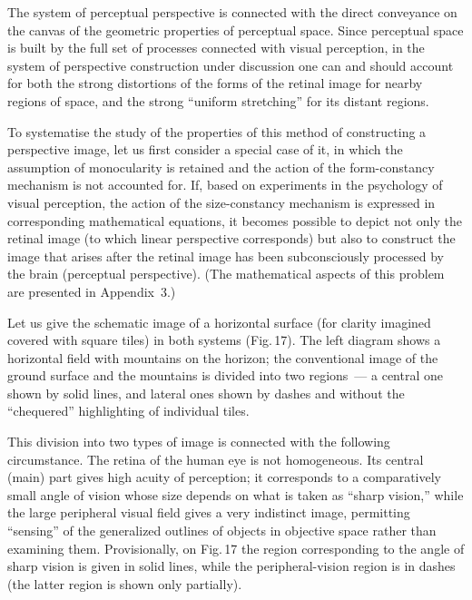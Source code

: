 
The system of perceptual perspective is connected with the direct conveyance on the
canvas of the geometric properties of perceptual space.  Since perceptual space is built
by the full set of processes connected with visual perception, in the system of perspective
construction under discussion one can and should account for both the strong distortions
of the forms of the retinal image for nearby regions of space, and the strong ``uniform
stretching'' for its distant regions.

To systematise the study of the properties of this method of constructing a perspective
image, let us first consider a special case of it, in which the assumption of monocularity
is retained and the action of the form-constancy mechanism is not accounted for.  If,
based on experiments in the psychology of visual perception, the action of the
size-constancy mechanism is expressed in corresponding mathematical equations, it
becomes possible to depict not only the retinal image (to which linear perspective
corresponds) but also to construct the image that arises after the retinal image has been
subconsciously processed by the brain (perceptual perspective).  (The mathematical
aspects of this problem are presented in Appendix~3.)


Let us give the schematic image of a horizontal surface (for clarity imagined covered
with square tiles) in both systems (Fig.\,17).  The left diagram shows a horizontal field
with mountains on the horizon; the conventional image of the ground surface and the
mountains is divided into two regions~--- a central one shown by solid lines, and lateral
ones shown by dashes and without the ``chequered'' highlighting of individual tiles.

This division into two types of image is connected with the following circumstance.
The retina of the human eye is not homogeneous.  Its central (main) part gives high
acuity of perception; it corresponds to a comparatively small angle of vision whose size
depends on what is taken as ``sharp vision,'' while the large peripheral visual field
gives a very indistinct image, permitting ``sensing'' of the generalized outlines of
objects in objective space rather than examining them.  Provisionally, on Fig.\,17 the
region corresponding to the angle of sharp vision is given in solid lines, while the
peripheral-vision region is in dashes (the latter region is shown only partially).

